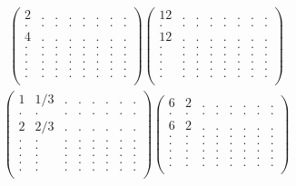 \documentclass[12pt,a4paper]{amsart}
\begin{document}
\begin{align*}
\left(\begin{array}{rrrrrrrr}%
2&.&.&.&.&.&.&.\\%
.&.&.&.&.&.&.&.\\%
4&.&.&.&.&.&.&.\\%
.&.&.&.&.&.&.&.\\%
.&.&.&.&.&.&.&.\\%
.&.&.&.&.&.&.&.\\%
.&.&.&.&.&.&.&.\\%
.&.&.&.&.&.&.&.\\%
\end{array}\right)%
\left(\begin{array}{rrrrrrrr}%
12&.&.&.&.&.&.&.\\%
.&.&.&.&.&.&.&.\\%
12&.&.&.&.&.&.&.\\%
.&.&.&.&.&.&.&.\\%
.&.&.&.&.&.&.&.\\%
.&.&.&.&.&.&.&.\\%
.&.&.&.&.&.&.&.\\%
.&.&.&.&.&.&.&.\\%
\end{array}\right)%
\end{align*}
\begin{align*}
\left(\begin{array}{rrrrrrrr}%
1&1/3&.&.&.&.&.&.\\%
.&.&.&.&.&.&.&.\\%
2&2/3&.&.&.&.&.&.\\%
.&.&.&.&.&.&.&.\\%
.&.&.&.&.&.&.&.\\%
.&.&.&.&.&.&.&.\\%
.&.&.&.&.&.&.&.\\%
.&.&.&.&.&.&.&.\\%
\end{array}\right)%
\left(\begin{array}{rrrrrrrr}%
6&2&.&.&.&.&.&.\\%
.&.&.&.&.&.&.&.\\%
6&2&.&.&.&.&.&.\\%
.&.&.&.&.&.&.&.\\%
.&.&.&.&.&.&.&.\\%
.&.&.&.&.&.&.&.\\%
.&.&.&.&.&.&.&.\\%
.&.&.&.&.&.&.&.\\%
\end{array}\right)%
\end{align*}
\end{document}
